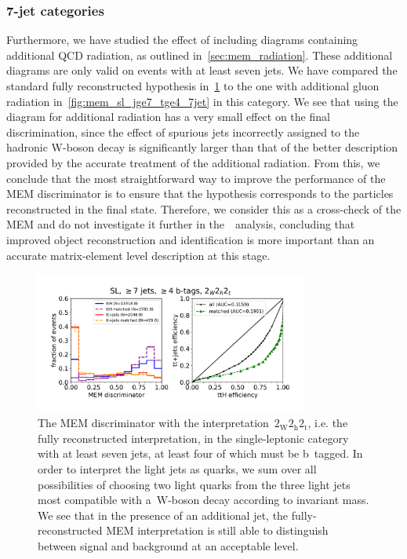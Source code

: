 \subsubsection{7-jet categories}
Furthermore, we have studied the effect of including diagrams containing additional QCD radiation, as outlined in~\cref{sec:mem_radiation}. These additional diagrams are only valid on events with at least seven jets. We have compared the standard fully reconstructed hypothesis in~\cref{fig:mem_sl_jge7_tge4} to the one with additional gluon radiation in~\cref{fig:mem_sl_jge7_tge4_7jet} in this category. We see that using the diagram for additional radiation has a very small effect on the final discrimination, since the effect of spurious jets incorrectly assigned to the hadronic W-boson decay is significantly larger than that of the better description provided by the accurate treatment of the additional radiation. From this, we conclude that the most straightforward way to improve the performance of the MEM discriminator is to ensure that the hypothesis corresponds to the particles reconstructed in the final state. Therefore, we consider this as a cross-check of the MEM and do not investigate it further in the~\ttHbb\ analysis, concluding that improved object reconstruction and identification is more important than an accurate matrix-element level description at this stage.

\begin{figure}[ht]
\begin{centering}
\includegraphics[width = 0.8\textwidth]{figures/mem/mem_sl_jge7_tge4.pdf}
\caption[MEM with the~$2_{\mathrm{W}} 2_{\mathrm{h}} 2_{\mathrm{t}}$ interpretation in the $\ge7$-jet, $\ge4$ b~tag category]{The MEM discriminator with the interpretation~$2_{\mathrm{W}} 2_{\mathrm{h}} 2_{\mathrm{t}}$, i.e. the fully reconstructed interpretation, in the single-leptonic category with at least seven jets, at least four of which must be b~tagged. In order to interpret the light jets as quarks, we sum over all possibilities of choosing two light quarks from the three light jets most compatible with a~$\mathrm{W}$-boson decay according to invariant mass. We see that in the presence of an additional jet, the fully-reconstructed MEM interpretation is still able to distinguish between signal and background at an acceptable level.}
\label{fig:mem_sl_jge7_tge4}
\end{centering}
\end{figure}

